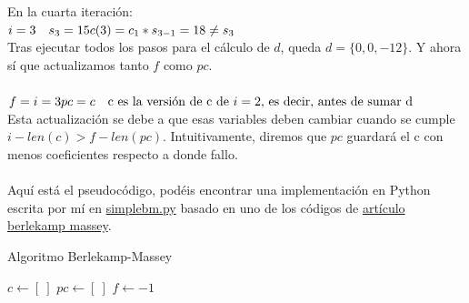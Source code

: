 \\\\
En la cuarta iteración: \\
\(i=3 \quad s_3 = 15 \\
c(3) = c_1 * s_{3-1} = 18 \neq s_3\\
\)\\
Tras ejecutar todos los pasos para el cálculo de $d$, queda $d = \{ 0, 0, -12\}$. Y ahora sí que actualizamos tanto $f$ como $pc$.\\\\
\(f = i = 3 \\
pc = c \quad \text{c es la versión de c de $i=2$, es decir, antes de sumar d}\\
\)\\
Esta actualización se debe a que esas variables deben cambiar cuando se cumple $i - len(c) > f - len(pc)$. Intuitivamente, diremos que $pc$ guardará el c con menos coeficientes respecto a donde fallo. \\\\%
Aquí está el pseudocódigo, podéis encontrar una implementación en Python escrita por mí en \href{https://github.com/domingoUnican/TFGPedroCastro/blob/main/code/code_proofs/simple_berlekamp_massey.py}{simplebm.py} basado en uno de los códigos de \href{https://mzhang2021.github.io/cp-blog/berlekamp-massey/}{artículo berlekamp massey}.



\begin{algorithm}
\caption{Algoritmo Berlekamp-Massey}\label{alg:two}
$c \gets [ \ ]$\;
$pc \gets [ \ ]$\;
$f \gets -1$\;
\end{algorithm}





